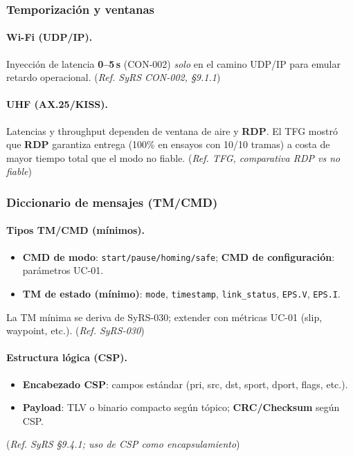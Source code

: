 \subsubsection{Temporización y ventanas}
\paragraph{Wi-Fi (UDP/IP).}
Inyección de latencia \textbf{0–5\,s} (CON-002) \emph{solo} en el camino UDP/IP para emular retardo operacional.
(\emph{Ref. SyRS CON-002, §9.1.1})%

\paragraph{UHF (AX.25/KISS).}
Latencias y throughput dependen de ventana de aire y \textbf{RDP}. El TFG mostró que \textbf{RDP} garantiza
entrega (100\% en ensayos con 10/10 tramas) a costa de mayor tiempo total que el modo no fiable.%
(\emph{Ref. TFG, comparativa RDP vs no fiable})%

\subsubsection{Diccionario de mensajes (TM/CMD)}
\paragraph{Tipos TM/CMD (mínimos).}
\begin{itemize}
  \item \textbf{CMD de modo}: \verb|start/pause/homing/safe|; \textbf{CMD de configuración}: parámetros UC-01.
  \item \textbf{TM de estado (mínimo)}: \verb|mode|, \verb|timestamp|, \verb|link_status|, \verb|EPS.V|, \verb|EPS.I|.
\end{itemize}
La TM mínima se deriva de SyRS-030; extender con métricas UC-01 (slip, waypoint, etc.).%
(\emph{Ref. SyRS-030})%

\paragraph{Estructura lógica (CSP).}
\begin{itemize}
  \item \textbf{Encabezado CSP}: campos estándar (pri, src, dst, sport, dport, flags, etc.).
  \item \textbf{Payload}: TLV o binario compacto según tópico; \textbf{CRC/Checksum} según CSP.
\end{itemize}
(\emph{Ref. SyRS §9.4.1; uso de CSP como encapsulamiento})%

